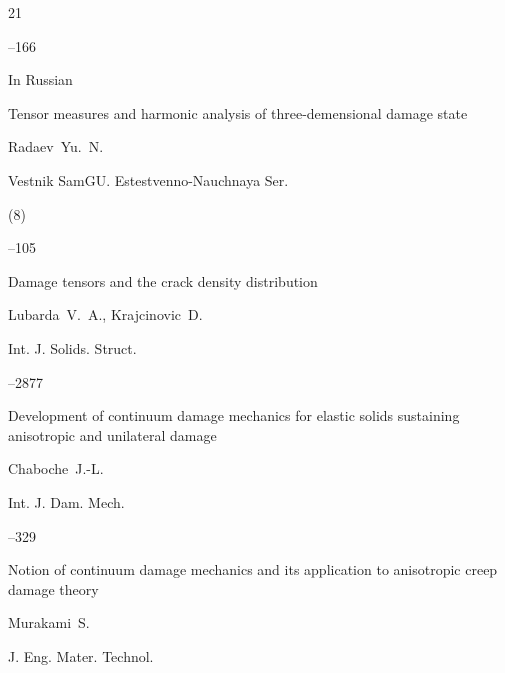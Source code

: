 \begin{thebibliography}{21}

--166






\lang In Russian

\paper Tensor measures and harmonic analysis of three-demensional damage state

\by Radaev~Yu.~N.

\jour Vestnik SamGU. Estestvenno-Nauchnaya Ser.


(8)

--105




\paper Damage tensors and the crack density distribution

\by Lubarda~V.~A., Krajcinovic~D.

\jour Int. J. Solids. Struct.




--2877







\paper Development of continuum damage mechanics for elastic solids sustaining anisotropic and unilateral damage

\by Chaboche~J.-L.

\jour Int. J. Dam. Mech.




--329





\paper Notion of continuum damage mechanics and its application to anisotropic creep damage theory

\by Murakami~S.

\jour  J. Eng. Mater. Technol.




\end{thebibliography}
